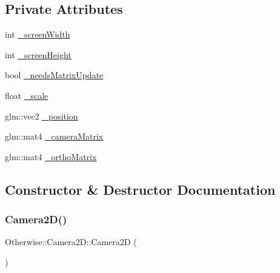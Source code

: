 \subsection*{Private Attributes}
\begin{DoxyCompactItemize}
\item 
int \hyperlink{class_otherwise_1_1_camera2_d_a568bfdd6c1ae38b02b6936d9ece07e28}{\+\_\+screen\+Width}
\item 
int \hyperlink{class_otherwise_1_1_camera2_d_a5bba4447f680c5edc1f12ea44c6258da}{\+\_\+screen\+Height}
\item 
bool \hyperlink{class_otherwise_1_1_camera2_d_a068ba51b7776d1819a64271424739766}{\+\_\+needs\+Matrix\+Update}
\item 
float \hyperlink{class_otherwise_1_1_camera2_d_aa15cebd1c3ce46b4fb7ed8d2a62ee309}{\+\_\+scale}
\item 
glm\+::vec2 \hyperlink{class_otherwise_1_1_camera2_d_a95e31908d77ba3f25f4ffcb6f453586c}{\+\_\+position}
\item 
glm\+::mat4 \hyperlink{class_otherwise_1_1_camera2_d_a447909c36204fb2d5113641a5e6aa50e}{\+\_\+camera\+Matrix}
\item 
glm\+::mat4 \hyperlink{class_otherwise_1_1_camera2_d_a42b670ca8680a75559b21f9ab8388b22}{\+\_\+ortho\+Matrix}
\end{DoxyCompactItemize}


\subsection{Constructor \& Destructor Documentation}
\mbox{\label{class_otherwise_1_1_camera2_d_a5c47dfba158bee50e826c01f8168d4eb}} 
\subsubsection{\texorpdfstring{Camera2\+D()}{Camera2D()}}
{\footnotesize\ttfamily Otherwise\+::\+Camera2\+D\+::\+Camera2D (\begin{DoxyParamCaption}{ }\end{DoxyParamCaption})}

\mbox{\label{class_otherwise_1_1_camera2_d_a4a2fd76b13d85479385190d64adce2ba}} 
